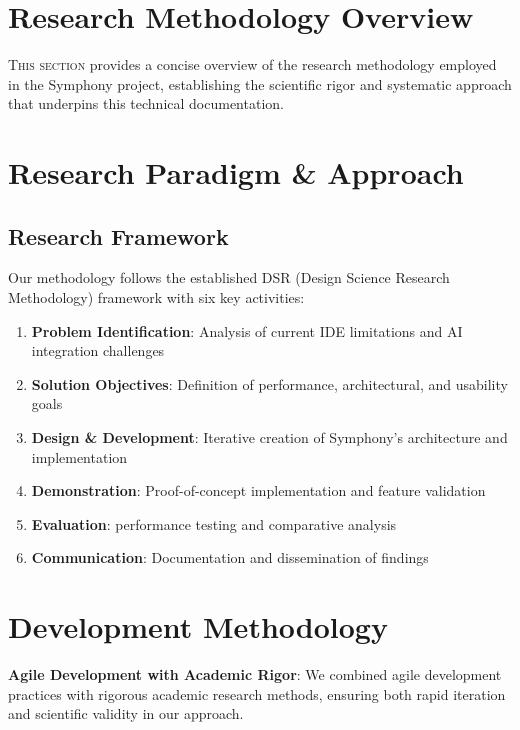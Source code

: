 
\section*{Research Methodology Overview}

\lettrine{T}{his section} provides a concise overview of the research methodology employed in the Symphony project, establishing the scientific rigor and systematic approach that underpins this  technical documentation.

\section*{Research Paradigm \& Approach}

\subsection*{Research Framework}
Our methodology follows the established DSR (Design Science Research Methodology) framework with six key activities:

\begin{enumerate}
    \item \textbf{Problem Identification}: Analysis of current IDE limitations and AI integration challenges
    \item \textbf{Solution Objectives}: Definition of performance, architectural, and usability goals
    \item \textbf{Design \& Development}: Iterative creation of Symphony's architecture and implementation
    \item \textbf{Demonstration}: Proof-of-concept implementation and feature validation
    \item \textbf{Evaluation}:  performance testing and comparative analysis
    \item \textbf{Communication}: Documentation and dissemination of findings
\end{enumerate}

\section*{Development Methodology}

\begin{successbox}
\textbf{Agile Development with Academic Rigor}: We combined agile development practices with rigorous academic research methods, ensuring both rapid iteration and scientific validity in our approach.
\end{successbox}

